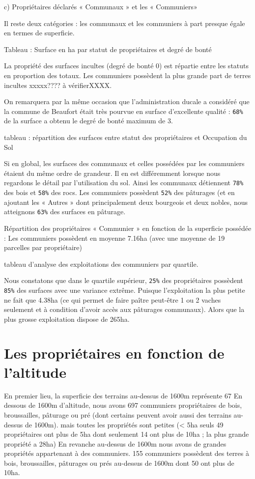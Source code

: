 \documentclass[12pt,a4paper]{report}
\begin{document}
	c) Propriétaires déclarés « Communaux » et les « Communiers»
	
	Il reste deux catégories : les communaux et les communiers à part presque égale en termes de superficie.
	
	
	Tableau : Surface en ha par statut de propriétaires et degré de bonté
	
	
	La propriété des surfaces incultes (degré de bonté 0) est répartie entre les statuts en proportion des totaux. Les communiers possèdent la plus grande part de terres incultes xxxxx???? à vérifierXXXX.
	
	
	On remarquera par la même occasion que l’administration ducale a considéré que la commune de Beaufort était très pourvue en surface d’excellente qualité : \texttt{68\%} de la surface a obtenu le degré de bonté maximum de 3.
	
	tableau : répartition des surfaces entre statut des propriétaires et Occupation du Sol

	Si en global, les surfaces des communaux et celles possédées par les communiers étaient du même ordre de grandeur. Il en est différemment lorsque nous regardons le détail par l’utilisation du sol. Ainsi les communaux détiennent \texttt{78\%} des bois et \texttt{58\%} des rocs. Les communiers possèdent \texttt{52\%} des pâturages (et en ajoutant les « Autres » dont principalement deux bourgeois et deux nobles, nous atteignons \texttt{63\%} des surfaces en pâturage.
	
	Répartition des propriétaires « Communier » en fonction de la superficie possédée : 
	Les communiers possèdent en moyenne 7.16ha (avec une moyenne de 19 parcelles par propriétaire)
	
	tableau d’analyse des exploitations des communiers par quartile.

	Nous constatons que dans le quartile supérieur, \texttt{25\%} des propriétaires possèdent \texttt{85\%} des surfaces avec une variance extrême. Puisque l’exploitation la plus petite ne fait que 4.38ha (ce qui permet de faire paître peut-être 1 ou 2 vaches seulement et à condition d’avoir accès aux pâturages communaux). Alors que la plus grosse exploitation dispose de 265ha.
	
\section{Les propriétaires en fonction de l’altitude}
	
	En premier lieu, la superficie des terrains au-dessus de 1600m représente 67%
	En dessous de 1600m d’altitude, nous avons 697 communiers propriétaires de bois, broussailles, pâturage ou pré (dont certains peuvent avoir aussi des terrains au-dessus de 1600m). mais toutes les propriétés sont petites (< 5ha seuls 49 propriétaires ont plus de 5ha dont seulement 14 ont plus de 10ha ; la plus grande propriété a 28ha)
	En revanche au-dessus de 1600m nous avons de grandes propriétés appartenant à des communiers. 155 communiers possèdent des terres à bois, broussailles, pâturages ou prés au-dessus de 1600m dont 50 ont plus de 10ha.
	
\end{document}
